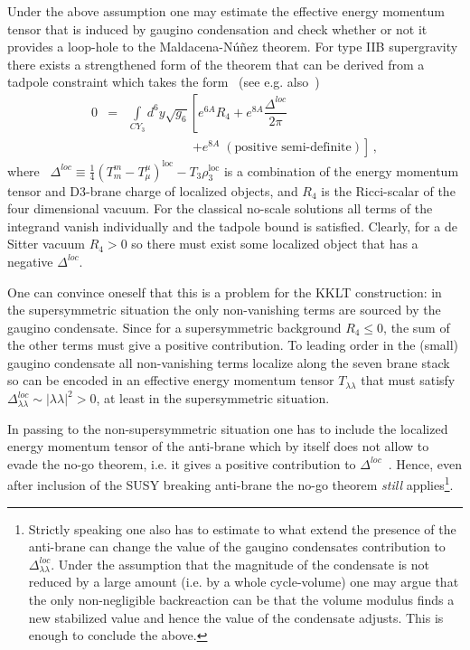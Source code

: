 \documentclass[aps,prd,amsmath,amsfonts,a4paper,11pt,reprint,twocolumn,square,numbers,showpacs,superscriptaddress,floatfix,sort&compress,nofootinbib]{revtex4-1}
\begin{document}
Under the above assumption one may estimate the effective energy momentum tensor that is induced by gaugino condensation and check whether or not it provides a loop-hole to the Maldacena-N\'{u}\~{n}ez theorem. For type IIB supergravity there exists a strengthened form of the theorem that can be derived from a tadpole constraint which takes the form~\cite{deAlwis:2003sn,Heidenreich:2010ad} (see e.g. also~\cite{Giddings:2001yu,Dasgupta:2014pma})
\begin{eqnarray}
0&=&\! \int\limits_{CY_3} \! \! \! d^6y\sqrt{g_6}\left[e^{6A}R_{4}+e^{8A}\dfrac{\Delta^{loc}}{2\pi}\right.\nonumber\\
&&\qquad\qquad\;\;\;\; \left.+e^{8A}\;(\text{positive semi-definite})\right]\, ,
\end{eqnarray} 
where \ $\Delta^{loc}\equiv\frac{1}{4}\left(T^m_m-T^{\mu}_{\mu}\right)^{\text{loc}}- T_3\rho_3^{\text{loc}}$ is a combination of the energy momentum tensor and D3-brane charge of localized objects, and $R_{4}$ is the Ricci-scalar of the four dimensional vacuum. For the classical no-scale solutions all terms of the integrand vanish individually and the tadpole bound is satisfied. Clearly, for a de Sitter vacuum $R_{4}>0$ so there must exist some localized object that has a negative $\Delta^{loc}$.

One can convince oneself that this is a problem for the KKLT construction: in the supersymmetric situation the only non-vanishing terms are sourced by the gaugino condensate. Since for a supersymmetric background $R_{4}\leq 0$, the sum of the other terms must give a positive contribution. To leading order in the (small) gaugino condensate all non-vanishing terms localize along the seven brane stack so can be encoded in an effective energy momentum tensor $T_{\lambda\lambda}$ that must satisfy $\Delta^{loc}_{\lambda\lambda}\sim |\lambda\lambda|^2>0$, at least in the supersymmetric situation.

In passing to the non-supersymmetric situation one has to include the localized energy momentum tensor of the anti-brane which by itself does not allow to evade the no-go theorem, i.e. it gives a positive contribution to $\Delta^{loc}$~\cite{Giddings:2001yu,Heidenreich:2010ad}. Hence, even after inclusion of the SUSY breaking anti-brane the no-go theorem \textit{still} applies\footnote{Strictly speaking one also has to estimate to what extend the presence of the anti-brane can change the value of the gaugino condensates contribution to $\Delta^{loc}_{\lambda\lambda}$. Under the assumption that the magnitude of the condensate is not reduced by a large amount (i.e. by a whole cycle-volume) one may argue that the only non-negligible backreaction can be that the volume modulus finds a new stabilized value and hence the value of the condensate adjusts. This is enough to conclude the above.}.
\end{document}
